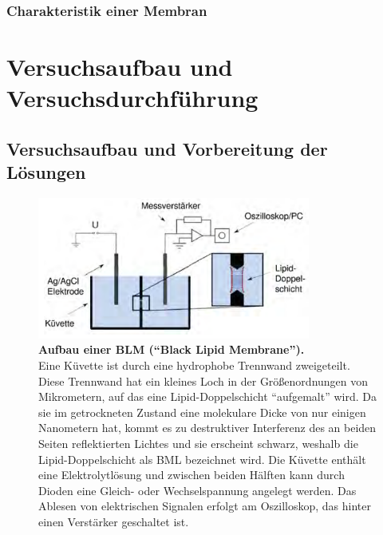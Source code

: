 \documentclass[a4paper,ngerman]{scrartcl}
\begin{document}
\subsubsection{Charakteristik einer Membran}












\clearpage
\section{Versuchsaufbau und Versuchsdurchführung}



\subsection{Versuchsaufbau und Vorbereitung der Lösungen}
\label{sec:bilayer-vorbereitung}

\begin{figure}[tb!]
  \centering
  \includegraphics[width=0.8\textwidth]{abbildungen/blmaufbau.png}
  \caption{\textbf{Aufbau einer BLM ("`Black Lipid Membrane"').} \\Eine Küvette ist durch eine hydrophobe Trennwand zweigeteilt. Diese Trennwand hat ein kleines Loch in der Größenordnungen von Mikrometern, auf das eine Lipid-Doppelschicht "`aufgemalt"' wird. Da sie im getrockneten Zustand eine molekulare Dicke von nur einigen Nanometern hat, kommt es zu destruktiver Interferenz des an beiden Seiten reflektierten Lichtes und sie erscheint schwarz, weshalb die Lipid-Doppelschicht als BML bezeichnet wird. Die Küvette enthält eine Elektrolytlösung und zwischen beiden Hälften kann durch Dioden eine Gleich- oder Wechselspannung angelegt werden. Das Ablesen von elektrischen Signalen erfolgt am Oszilloskop, das hinter einen Verstärker geschaltet ist.}
  \label{fig:blmaufbau}
\end{figure}
\end{document}
